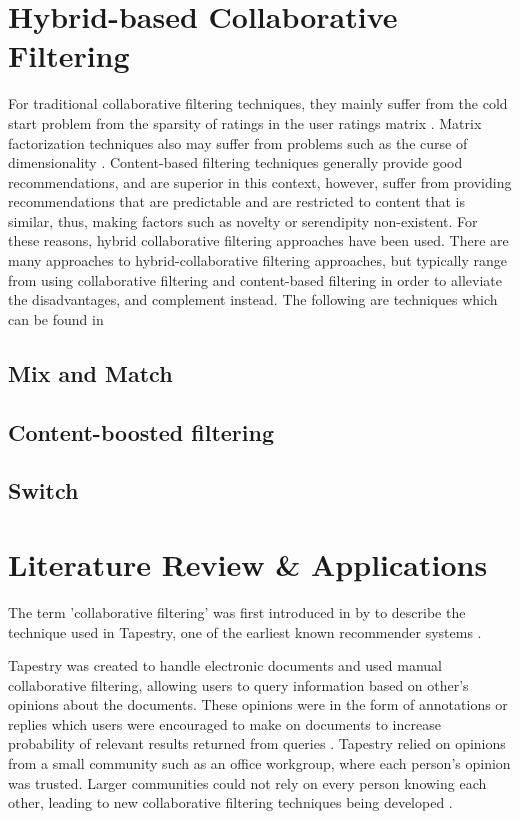 \section{Hybrid-based Collaborative Filtering}
For traditional collaborative filtering techniques, they mainly suffer from the cold start problem from the sparsity of ratings in the user ratings matrix . Matrix factorization techniques also may suffer from problems such as the curse of dimensionality . Content-based filtering techniques generally provide good recommendations, and are superior in this context, however, suffer from providing recommendations that are predictable and are restricted to content that is similar, thus, making factors such as novelty or serendipity non-existent. For these reasons, hybrid collaborative filtering approaches have been used. There are many approaches to hybrid-collaborative filtering approaches, but typically range from using collaborative filtering and content-based filtering in order to alleviate the disadvantages, and complement instead. The following are techniques which can be found in 
\subsection{Mix and Match}
\subsection{Content-boosted filtering}
\subsection{Switch}

\section{Literature Review \& Applications}

The term 'collaborative filtering' was first introduced in \citeyear{goldberg1992using} by \citeauthor{goldberg1992using} to describe the technique used in Tapestry, one of the earliest known recommender systems \cite{koren2009matrix,  goldberg1992using, itembased, survey}.

Tapestry \cite{goldberg1992using} was created to handle electronic documents and used manual collaborative filtering, allowing users to query information based on other's opinions about the documents. These opinions were in the form of annotations or replies which users were encouraged to make on documents to increase probability of relevant results returned from queries \cite{schafer2007collaborative}. Tapestry relied on opinions from a small community such as an office workgroup, where each person's opinion was trusted. Larger communities could not rely on every person knowing each other, leading to new collaborative filtering techniques being developed \cite{itembased}. 

